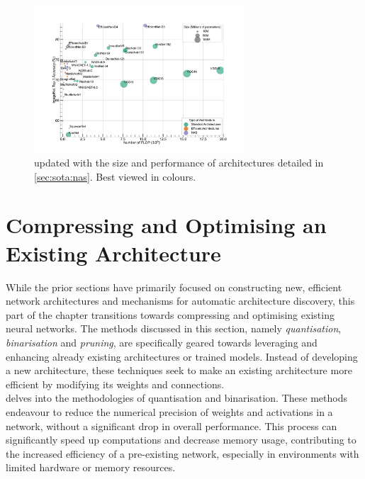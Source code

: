 \begin{figure}[htbp]
  \centering
  \includegraphics[width=0.70\textwidth]{chapter_sota/assets/network_sizes_normal_eff_nas.pdf}
  \caption{ updated with the size and
    performance of architectures detailed in \cref{sec:sota:nas}. Best viewed in
    colours.}
  \label{fig:sota:net_sizes_std_eff_nas}
\end{figure}

\section{Compressing and Optimising an Existing Architecture}\label{sec:sota:refining_existing}

While the prior sections have primarily focused on constructing new, efficient
network architectures and mechanisms for automatic architecture discovery, this
part of the chapter transitions towards compressing and optimising existing neural
networks. The methods discussed in this section, namely \emph{quantisation},
\emph{binarisation} and \emph{pruning}, are specifically geared towards
leveraging and enhancing already existing architectures or trained models.
Instead of developing a new architecture, these techniques seek to make an
existing architecture more efficient by modifying its weights and connections.\\

 delves into the methodologies of quantisation and
binarisation. These methods endeavour to reduce the numerical precision of
weights and activations in a network, without a significant drop in overall
performance. This process can significantly speed up computations and decrease
memory usage, contributing to the increased efficiency of a pre-existing
network, especially in environments with limited hardware or memory resources.\\

